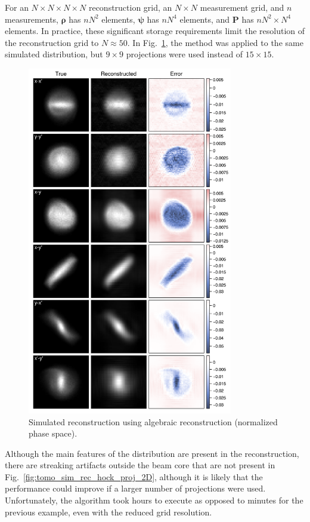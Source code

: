 For an $N \times N \times N \times N$ reconstruction grid, an $N \times N$ measurement grid, and $n$ measurements, $\bm{\rho}$ has $nN^2$ elements, $\bm{\psi}$ has $n N^4$ elements, and $\mathbf{P}$ has $n N^2 \times N^4$ elements. In practice, these significant storage requirements limit the resolution of the reconstruction grid to $N \approx 50$. In Fig.~\ref{fig:tomo_sim_rec_art_proj_2D}, the method was applied to the same simulated distribution, but $9 \times 9$ projections were used instead of $15 \times 15$.
%
\begin{figure}[!p]
    \centering
    \includegraphics[width=0.8\textwidth]{Images/chapter4/tomo_sim_rec_art_proj_2D_ver.png}
    \caption{Simulated reconstruction using algebraic reconstruction (normalized phase space).}
    \label{fig:tomo_sim_rec_art_proj_2D}
\end{figure}
%
Although the main features of the distribution are present in the reconstruction, there are streaking artifacts outside the beam core that are not present in Fig.~\ref{fig:tomo_sim_rec_hock_proj_2D}, although it is likely that the performance could improve if a larger number of projections were used. Unfortunately, the algorithm took hours to execute as opposed to minutes for the previous example, even with the reduced grid resolution.


